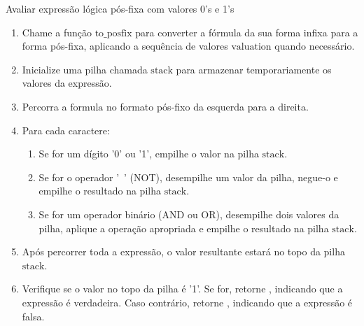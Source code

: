 \documentclass{article}
\begin{document}
\begin{adjustwidth}{1em}{1em}
\begin{algorithm}
\caption{Avaliar expressão lógica pós-fixa com valores 0's e 1's}
\begin{enumerate}
    \item Chame a função $\text{{to\_posfix}}$ para converter a fórmula da sua forma infixa para a forma pós-fixa, aplicando a sequência de valores $\text{{valuation}}$ quando necessário.
    \item Inicialize uma pilha chamada $\text{{stack}}$ para armazenar temporariamente os valores da expressão.
    \item Percorra a $\text{{formula}}$ no formato pós-fixo da esquerda para a direita.
    \item Para cada caractere:
    \begin{enumerate}
        \item Se for um dígito '0' ou '1', empilhe o valor na pilha $\text{{stack}}$.
        \item Se for o operador '~' (NOT), desempilhe um valor da pilha, negue-o e empilhe o resultado na pilha $\text{{stack}}$.
        \item Se for um operador binário (AND ou OR), desempilhe dois valores da pilha, aplique a operação apropriada e empilhe o resultado na pilha $\text{{stack}}$.
    \end{enumerate}
    \item Após percorrer toda a expressão, o valor resultante estará no topo da pilha $\text{{stack}}$.
    \item Verifique se o valor no topo da pilha é '1'. Se for, retorne , indicando que a expressão é verdadeira. Caso contrário, retorne , indicando que a expressão é falsa.
\end{enumerate}
\end{algorithm}



\end{adjustwidth}
\end{document}
